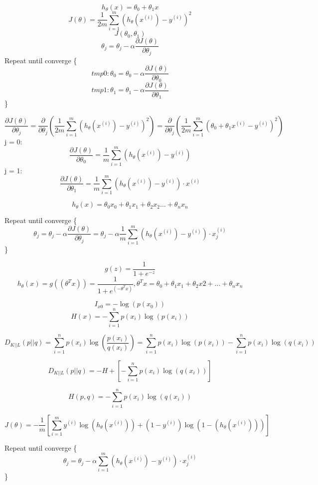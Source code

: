 \documentclass{article}
\begin{document}
\title{}
\author{}
\date{}
\maketitle

$$ h_\theta(x) = \theta_0 + \theta_1x $$
$$ J(\theta)=\frac{1}{2m}\sum_{i=1}^{m}(h_\theta(x^{(i)})-y^{(i)})^2 $$
$$ J(\theta_0, \theta_1) $$
$$ \theta_j = \theta_j-\alpha\frac{\partial J(\theta)}{\partial \theta_j}$$
Repeat until converge \{ $$tmp0: \theta_0=\theta_0-\alpha\frac{\partial J(\theta)}{\partial \theta_0}$$
$$tmp1: \theta_1=\theta_1-\alpha\frac{\partial J(\theta)}{\partial \theta_1}$$
\}

$$\frac{\partial J(\theta)}{\partial \theta_j} = \frac{\partial}{\partial \theta_j}(\frac{1}{2m}\sum_{i=1}^{m}(h_\theta(x^{(i)})-y^{(i)})^2)
=\frac{\partial}{\partial \theta_j}(\frac{1}{2m}\sum_{i=1}^{m}(\theta_0 + \theta_1x^{(i)}-y^{(i)})^2)$$
j = 0:$$\frac{\partial J(\theta)}{\partial \theta_0} = \frac{1}{m}\sum_{i=1}^{m}(h_\theta(x^{(i)})-y^{(i)})$$
j = 1:$$\frac{\partial J(\theta)}{\partial \theta_1} = \frac{1}{m}\sum_{i=1}^{m}(h_\theta(x^{(i)})-y^{(i)})\cdot x^{(i)}$$

$$h_\theta(x) = \theta_0x_0 + \theta_1x_1 + \theta_2x_2\dots + \theta_nx_n$$

Repeat until converge \{ $$\theta_j=\theta_j-\alpha\frac{\partial J(\theta)}{\partial \theta_j}=
\theta_j-\alpha\frac{1}{m}\sum_{i=1}^{m}(h_\theta(x^{(i)})-y^{(i)})\cdot x_j^{(i)}$$
\}

$$g(z)=\frac{1}{1+e^{-z}}$$
$$h_\theta(x)=g((\theta^Tx))=\frac{1}{1+e^(-\theta^Tx)}, \theta^Tx=\theta_0+\theta_1x_1+\theta_2x2+ \dots +\theta_nx_n$$

$$I_{x0}=-\log(p(x_0))$$
$$H(x)=-\sum_{i=1}^{n}p(x_i)\log(p(x_i))$$

$$D_{K||L}(p||q)=\sum_{i=1}^{n}p(x_i)\log(\frac{p(x_i)}{q(x_i)})=\sum_{i=1}^{n}p(x_i)\log(p(x_i))-\sum_{i=1}^{n}p(x_i)\log(q(x_i))$$

$$D_{K||L}(p||q)=-H+[-\sum_{i=1}^{n}p(x_i)\log(q(x_i))]$$

$$H(p,q)=-\sum_{i=1}^{n}p(x_i)\log(q(x_i))$$

$$J(\theta)=-\frac{1}{m}[\sum_{i=1}^{m}y^{(i)}\log(h_\theta(x^{(i)}))+(1-y^{(i)})\log(1-(h_\theta(x^{(i)})))]$$

Repeat until converge \{
$$\theta_j=\theta_j-\alpha\sum_{i=1}^{m}(h_\theta(x^{(i)})-y^{(i)})\cdot x_j^{(i)}$$
\}
\end{document}
